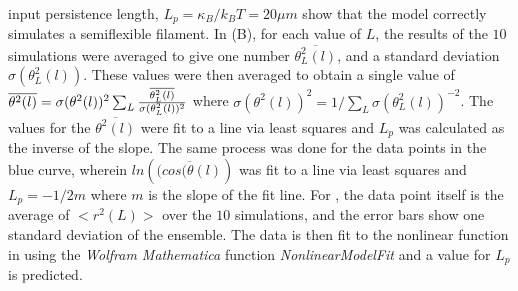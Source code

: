 \documentclass[12pt]{article} \usepackage{times} \usepackage{graphicx}
\begin{document}
input persistence length, $L_p = \kappa_B/k_BT = 20\mu m$ show that the model
correctly simulates a semiflexible filament.  In (B), for
each value of $L$, the results of the $10$ simulations were averaged to give
one number $\overline{\theta^2_L(l)}$, and a standard deviation
$\sigma(\theta^2_L(l))$. These values were then averaged to obtain a single
value of $\overline{\theta^2(l)} =
\sigma(\theta^2(l))^2\sum_L{\overline{\theta^2_L(l)}\over\sigma(\theta^2_L(l))^2}$
where $\sigma(\theta^2(l))^2 = 1/\sum_L{\sigma(\theta^2_L(l))^{-2}}$. The
values for the $\overline{\theta^2(l)}$ were fit to a line via least squares
and $L_p$ was calculated as the inverse of the slope. The same process was done
for the data points in the blue curve, wherein $ln(\overline{(cos(\theta(l)})$
was fit to a line via least squares and $L_p = -1/2m$ where $m$ is the slope of
the fit line. For , the data point itself is the average of
$<r^2(L)>$ over the $10$ simulations, and the error bars show one standard
deviation of the ensemble. The data is then fit to the nonlinear function in
 using the \textit{Wolfram Mathematica} function
\textit{NonlinearModelFit} and a value for $L_p$ is predicted. 
\end{document}
